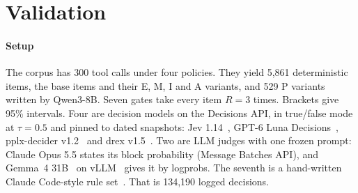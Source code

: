
\section{Validation}\label{sec:validation}

\paragraph{Setup} The corpus has 300 tool calls under four policies. They yield 5,861 deterministic items, the base items and their E, M, I and A
variants, and 529 P variants written by Qwen3-8B. Seven gates take
every item $R=3$ times. Brackets give 95\% intervals. Four are decision models on the Decisions API, in
true/false mode at $\tau=0.5$ and pinned to dated snapshots: Jev
1.14~\cite{openrouter2026jev114,typesafe2026models}, GPT-6 Luna
Decisions~\cite{openrouter2026luna}, pplx-decider
v1.2~\cite{openrouter2026pplxdecider} and drex v1.5~\cite{openrouter2026drex}.
Two are LLM judges with one frozen prompt: Claude Opus 5.5 states its block
probability (Message Batches API), and Gemma~4 31B~\cite{google2026gemma4} on
vLLM~\cite{kwon2023efficient} gives it by logprobs. The seventh is a
hand-written Claude Code-style rule set~\cite{anthropic2026permissions}. That
is 134,190 logged decisions.

\begin{table}[t]
\centering
\caption{Flip rate above the noise floor, in points: the share of variants whose verdict differs from the original call's, minus the share that differs between identical requests; $R=3$. Monotonicity counts riskier calls that get a less strict verdict or a lower block probability. Bold: 95\% interval above 0. $^\dagger$: survives Bonferroni over 35 tests. Intervals are in the released tables.}
\label{tab:flips}
\footnotesize
\setlength{\tabcolsep}{9pt}

\end{table}

